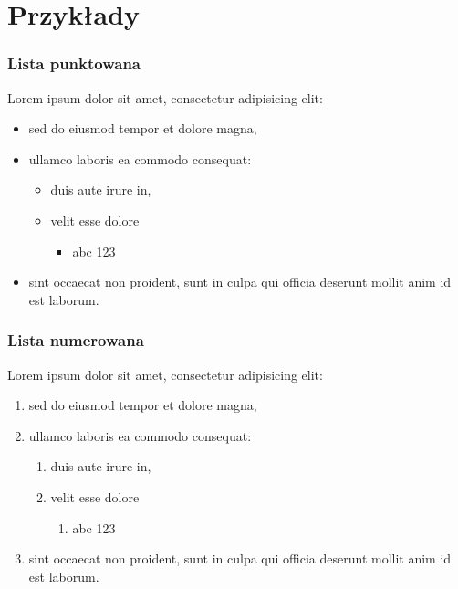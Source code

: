 \documentclass{beamer}
\begin{document}
\section{Przykłady}

\begin{frame}

  \frametitle{Lista punktowana}
  Lorem ipsum dolor sit amet, consectetur adipisicing elit:
  \begin{itemize}
    \item sed do eiusmod tempor et dolore magna,
    \item ullamco laboris ea commodo consequat:
          \begin{itemize}
            \item duis aute irure in,
            \item velit esse dolore
                  \begin{itemize}
                    \item abc 123
                  \end{itemize}
          \end{itemize}
    \item sint occaecat non proident, sunt in culpa qui officia
          deserunt mollit anim id est laborum.
  \end{itemize}

\end{frame}

\begin{frame}
  \frametitle{Lista numerowana}

  Lorem ipsum dolor sit amet, consectetur adipisicing elit:
  \begin{enumerate}
    \item sed do eiusmod tempor et dolore magna,
    \item ullamco laboris ea commodo consequat:
          \begin{enumerate}
            \item duis aute irure in,
            \item velit esse dolore
                  \begin{enumerate}
                    \item abc 123
                  \end{enumerate}
          \end{enumerate}
    \item sint occaecat non proident, sunt in culpa qui officia
          deserunt mollit anim id est laborum.
  \end{enumerate}

\end{frame}
\end{document}
